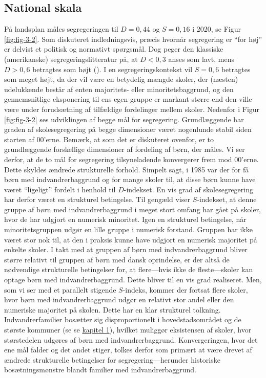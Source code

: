 \documentclass[
]{book}
\begin{document}
\subsection{National skala}\label{national-skala}

På landsplan måles segregeringen til \(D = 0,44\) og \(S = 0,16\) i 2020, se Figur \ref{fig:fig-3-2}. Som diskuteret indledningsvis, præcis hvornår segregering er ``for høj'' er delvist et politisk og normativt spørgsmål. Dog peger den klassiske (amerikanske) segregeringslitteratur på, at \(D<0,3\) anses som lavt, mens \(D>0,6\) betragtes som højt (). I en segregeringskontekst vil \(S=0,6\) betragtes som meget højt, da der vil være en betydelig mængde skoler, der (næsten) udelukkende består af enten majoritets- eller minoritetsbaggrund, og den gennemsnitlige eksponering til ens egen gruppe er markant større end den ville være under forudsætning af tilfældige fordelinger mellem skoler. Nedenfor i Figur \ref{fig:fig-3-2} ses udviklingen af begge mål for segregering. Grundlæggende har graden af skolesegregering på begge dimensioner været nogenlunde stabil siden starten af 00'erne. Bemærk, at som det er diskuteret ovenfor, er to grundlæggende forskellige dimensioner af fordeling af børn, der måles. Vi ser derfor, at de to mål for segregering tilsyneladende konvergerer frem mod 00'erne. Dette skyldes ændrede strukturelle forhold. Simpelt sagt, i 1985 var der for få børn med indvandrerbaggrund og for mange skoler til, at disse børn kunne have været ``ligeligt'' fordelt i henhold til \(D\)-indekset. En vis grad af skolesegregering har derfor været en strukturel betingelse. Til gengæld viser \(S\)-indekset, at denne gruppe af børn med indvandrerbaggrund i meget stort omfang har gået på skoler, hvor de har udgjort en numerisk minoritet. Igen en strukturel betingelse, når minoritetsgruppen udgør en lille gruppe i numerisk forstand. Gruppen har ikke været stor nok til, at den i praksis kunne have udgjort en numerisk majoritet på enkelte skoler. I takt med at gruppen af børn med indvandrerbaggrund bliver større relativt til gruppen af børn med dansk oprindelse, er der altså de nødvendige strukturelle betingelser for, at flere---hvis ikke de fleste---skoler kan optage børn med indvandrerbaggrund. Dette bliver til en vis grad realiseret. Men, som vi ser med et parallelt stigende \(S\)-indeks, kommer der fortsat flere skoler, hvor børn med indvandrerbaggrund udgør en relativt stor andel eller den numeriske majoritet på skolen. Dette har en klar strukturel tolkning. Indvandrerfamilier bosætter sig disproportionelt i hovedstadsområdet og de største kommuner (se se \hyperref[kap1]{kapitel 1}), hvilket muliggør eksistensen af skoler, hvor størstedelen udgøres af børn med indvandrerbaggrund. Konvergeringen, hvor det ene mål falder og det andet stiger, tolkes derfor som primært at være drevet af ændrede strukturelle betingelser for segregering---herunder historiske bosætningsmønstre blandt familier med indvandrerbaggrund.
\end{document}
